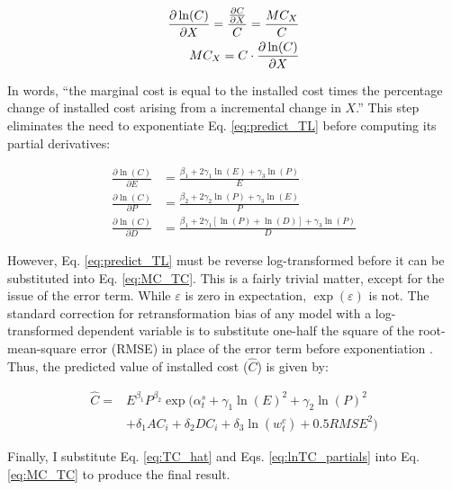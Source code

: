 \begin{align}\label{eq:MC_TC}
	\frac{\partial \ln(C)}{\partial X} = \frac{\frac{\partial C}{\partial X}}{C} = \frac{MC_X}{C} \notag \\
	MC_X = C \cdot \frac{\partial \ln(C)}{\partial X}
\end{align}

In words, ``the marginal cost is equal to the installed cost times the percentage change of installed cost arising from a incremental change in $X$.'' This step eliminates the need to exponentiate Eq. \ref{eq:predict_TL} before computing its partial derivatives:

\begin{subequations}\label{eq:lnTC_partials}
\begin{align}
    \frac{\partial \ln(C)}{\partial E} &= \frac{\beta_1 + 2 \gamma_1 \ln(E) + \gamma_3 \ln(P)}{E} \label{eq:lnTC_partial_e} \\
    \frac{\partial \ln(C)}{\partial P} &= \frac{\beta_2 + 2 \gamma_2 \ln(P) + \gamma_3 \ln(E)}{P} \label{eq:lnTC_partial_p} \\
    \frac{\partial \ln(C)}{\partial D} &= \frac{\beta_1 + 2 \gamma_1[\ln(P)+\ln(D)] + \gamma_3 \ln(P)}{D} \label{eq:lnTC_partial_d}
\end{align}
\end{subequations}

However, Eq. \ref{eq:predict_TL} must be reverse log-transformed before it can be substituted into Eq. \ref{eq:MC_TC}. This is a fairly trivial matter, except for the issue of the error term. While  $\varepsilon$ is zero in expectation, $\exp(\varepsilon)$ is not. The standard correction for retransformation bias of any model with a log-transformed dependent variable is to substitute one-half the square of the root-mean-square error (RMSE) in place of the error term before exponentiation \citep{miller1984}. Thus, the predicted value of installed cost ($\widehat{C}$) is given by:

\begin{equation}\label{eq:TC_hat}
\begin{split}
\widehat{C} =  & E^{\beta_1} P^{\beta_2} \exp(\alpha^{s}_{t} + \gamma_1 \ln(E)^2 + \gamma_2 \ln(P)^2 \\
		 & + \delta_1 AC_i + \delta_2 DC_i + \delta_3 \ln(w^{c}_{t}) + 0.5 RMSE^2)
\end{split}
\end{equation}

Finally, I substitute Eq. \ref{eq:TC_hat} and Eqs. \ref{eq:lnTC_partials} into Eq. \ref{eq:MC_TC} to produce the final result. 

